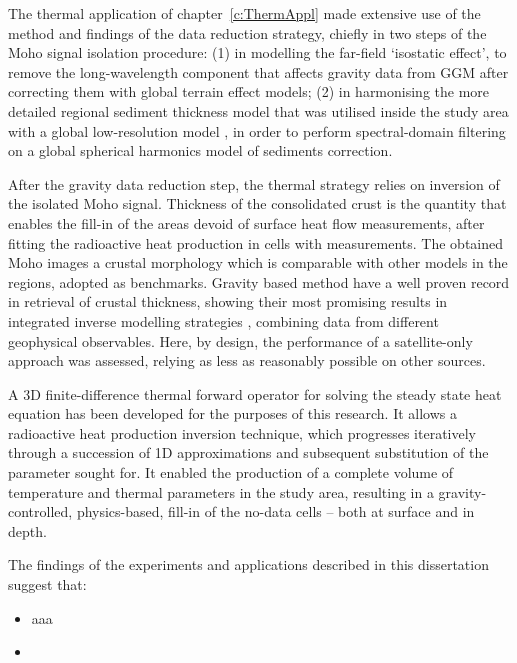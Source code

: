 The thermal application of chapter~\ref{c:ThermAppl} made extensive use of the method and findings of the data reduction strategy, chiefly in two steps of the Moho signal isolation procedure:
(1) in modelling the far-field `isostatic effect', to remove the long-wavelength component that affects gravity data from GGM after correcting them with global terrain effect models; (2) in harmonising the more detailed regional sediment thickness model that was utilised inside the study area \parencite[{EuCRUST},][]{Tesauro2008} with a global low-resolution model \parencite[{LITHO1.0},][]{Pasyanos2014}, in order to perform spectral-domain filtering on a global spherical harmonics model of sediments correction.

After the gravity data reduction step, the thermal strategy relies on inversion of the isolated Moho signal.
Thickness of the consolidated crust is the quantity that enables the fill-in of the areas devoid of surface heat flow measurements, after fitting the radioactive heat production in cells with measurements.
The obtained Moho images a crustal morphology which is comparable with other models in the regions, adopted as benchmarks.
Gravity based method have a well proven record in retrieval of crustal thickness, showing their most promising results in integrated inverse modelling strategies \parencites[e.g.][]{Eshagh2011}{Reguzzoni2015}, combining data from different geophysical observables.
Here, by design, the performance of a satellite-only approach was assessed, relying as less as reasonably possible on other sources.

A 3D finite-difference thermal forward operator for solving the steady state heat equation has been developed for the purposes of this research.
It allows a radioactive heat production inversion technique, which progresses iteratively through a succession of 1D approximations and subsequent substitution of the parameter sought for.
It enabled the production of a complete volume of temperature and thermal parameters in the study area, resulting in a gravity-controlled, physics-based, fill-in of the no-data cells -- both at surface and in depth.

The findings of the experiments and applications described in this dissertation suggest that:
\begin{itemize}
    \item aaa %
    \item %
\end{itemize}



